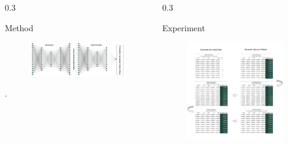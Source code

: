 \documentclass{msuposter}
\newcommand{\colwidth}{0.3\linewidth}
\begin{document}
\begin{frame}{}
\begin{columns}[t]
\begin{column}{\colwidth}
\begin{block}{Method}
\begin{figure}
  \includegraphics[width=\linewidth]{gan_diag.png}
\end{figure}

\newpage 



\end{block}. 


\end{column}


\begin{column}{\colwidth}

\begin{block}{Experiment}

\begin{figure}
  \includegraphics[width=\linewidth]{gan_conv.png}
\end{figure}


\end{block}
\end{column}
\end{columns}
\end{frame}
\end{document}
